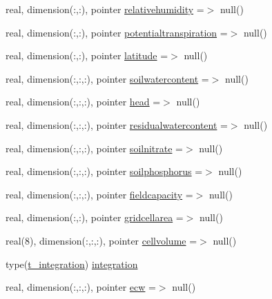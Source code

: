 \begin{DoxyCompactItemize}
\item 
real, dimension(\+:,\+:), pointer \mbox{\hyperlink{structmodulevegetation_1_1t__external_aca448111885ea129df8c0737aead9eac}{relativehumidity}} =$>$ null()
\item 
real, dimension(\+:,\+:), pointer \mbox{\hyperlink{structmodulevegetation_1_1t__external_aa23f31659288d54578f3677d6990e080}{potentialtranspiration}} =$>$ null()
\item 
real, dimension(\+:,\+:), pointer \mbox{\hyperlink{structmodulevegetation_1_1t__external_a886bfe93f242d825e9fcd5ddb3f65376}{latitude}} =$>$ null()
\item 
real, dimension(\+:,\+:,\+:), pointer \mbox{\hyperlink{structmodulevegetation_1_1t__external_a0d2d7ca9dc1575c3d2bc3aece1ff5bd5}{soilwatercontent}} =$>$ null()
\item 
real, dimension(\+:,\+:,\+:), pointer \mbox{\hyperlink{structmodulevegetation_1_1t__external_a00e7874b6bd226fef8c415239b1c41e0}{head}} =$>$ null()
\item 
real, dimension(\+:,\+:,\+:), pointer \mbox{\hyperlink{structmodulevegetation_1_1t__external_ae0ab05b88fdc56d8fbc5d76818717530}{residualwatercontent}} =$>$ null()
\item 
real, dimension(\+:,\+:,\+:), pointer \mbox{\hyperlink{structmodulevegetation_1_1t__external_a26ceb7fc3c1968e4a8302cb03c1b8ea6}{soilnitrate}} =$>$ null()
\item 
real, dimension(\+:,\+:,\+:), pointer \mbox{\hyperlink{structmodulevegetation_1_1t__external_ac6f74f4fe2ae6b44e024d6131a55078d}{soilphosphorus}} =$>$ null()
\item 
real, dimension(\+:,\+:,\+:), pointer \mbox{\hyperlink{structmodulevegetation_1_1t__external_a080686962a3f73d4d7d852f32ca4ebfe}{fieldcapacity}} =$>$ null()
\item 
real, dimension(\+:,\+:), pointer \mbox{\hyperlink{structmodulevegetation_1_1t__external_a6445a7d1a844cbb547ac71943d774a14}{gridcellarea}} =$>$ null()
\item 
real(8), dimension(\+:,\+:,\+:), pointer \mbox{\hyperlink{structmodulevegetation_1_1t__external_a2d0a9fb649115fd07e9911f55078cf11}{cellvolume}} =$>$ null()
\item 
type(\mbox{\hyperlink{structmodulevegetation_1_1t__integration}{t\+\_\+integration}}) \mbox{\hyperlink{structmodulevegetation_1_1t__external_a564f18a3bc8fe04dc561f29d8e6a1997}{integration}}
\item 
real, dimension(\+:,\+:,\+:), pointer \mbox{\hyperlink{structmodulevegetation_1_1t__external_a14c416e1b4b2deb3716b24f121729d03}{ecw}} =$>$ null()
\end{DoxyCompactItemize}


